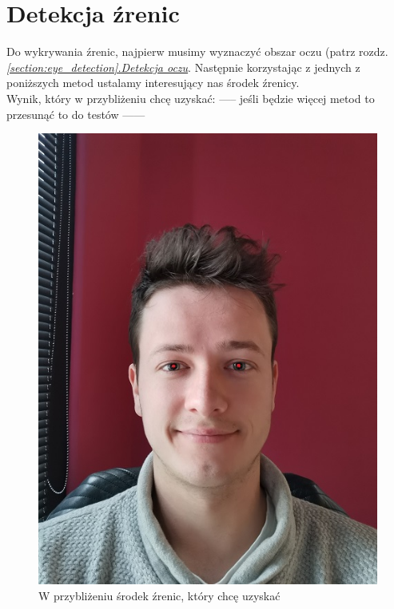 \newpage

\section{Detekcja źrenic}

Do wykrywania źrenic, najpierw musimy wyznaczyć obszar oczu (patrz rozdz. \hyperref[{section:eye_detection}]{\textit{\ref{section:eye_detection}.Detekcja oczu}}. Następnie korzystając z jednych z poniższych metod ustalamy interesujący nas środek źrenicy. \\
Wynik, który w przybliżeniu chcę uzyskać:
----- jeśli będzie więcej metod to przesunąć to do testów ------

\begin{figure}[!h]
    \begin{center}
        \includegraphics[scale=0.35]{img/pupil_section/expected_pupils.jpg}
        \caption{W przybliżeniu środek źrenic, który chcę uzyskać}
        \label{fig:expected_pupils}
    \end{center}
\end{figure}

